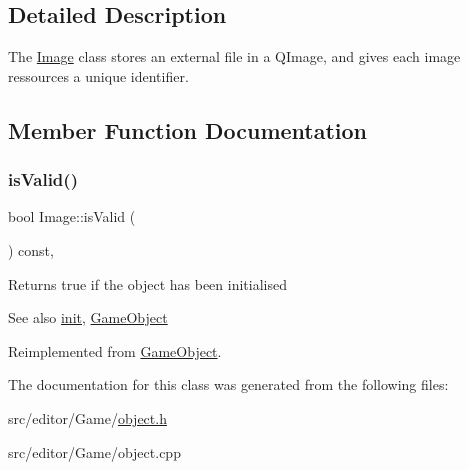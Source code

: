 \subsection{Detailed Description}
The \hyperlink{class_image}{Image} class stores an external file in a Q\+Image, and gives each image ressources a unique identifier. 

\subsection{Member Function Documentation}
\hypertarget{class_image_ac78aa7b47e7a8b279d2e95ac309ab375}{}\label{class_image_ac78aa7b47e7a8b279d2e95ac309ab375} 
\subsubsection{\texorpdfstring{is\+Valid()}{isValid()}}
{\footnotesize\ttfamily bool Image\+::is\+Valid (\begin{DoxyParamCaption}{ }\end{DoxyParamCaption}) const\hspace{0.3cm}{\ttfamily [inline]}, {\ttfamily [virtual]}}

Returns true if the object has been initialised

\begin{DoxySeeAlso}{See also}
\hyperlink{class_game_object_a97be7b59b2e76e7d60de2146b894eed9}{init}, \hyperlink{class_game_object_ab00c537faf6eb4439c60003141a763b9}{Game\+Object} 
\end{DoxySeeAlso}


Reimplemented from \hyperlink{class_game_object_a47fec909421c91c9a9cb5ef415d7cd23}{Game\+Object}.



The documentation for this class was generated from the following files\+:\begin{DoxyCompactItemize}
\item 
src/editor/\+Game/\hyperlink{object_8h}{object.\+h}\item 
src/editor/\+Game/object.\+cpp\end{DoxyCompactItemize}
